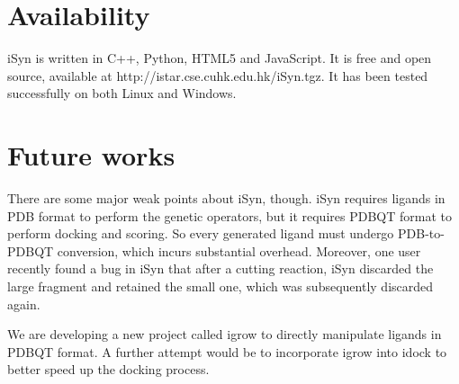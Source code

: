 \section{Availability}

iSyn is written in C++, Python, HTML5 and JavaScript. It is free and open source, available at http://istar.cse.cuhk.edu.hk/iSyn.tgz. It has been tested successfully on both Linux and Windows.

\section{Future works}

There are some major weak points about iSyn, though. iSyn requires ligands in PDB format to perform the genetic operators, but it requires PDBQT format to perform docking and scoring. So every generated ligand must undergo PDB-to-PDBQT conversion, which incurs substantial overhead. Moreover, one user recently found a bug in iSyn that after a cutting reaction, iSyn discarded the large fragment and retained the small one, which was subsequently discarded again.

We are developing a new project called igrow to directly manipulate ligands in PDBQT format. A further attempt would be to incorporate igrow into idock to better speed up the docking process.

\chapterend

